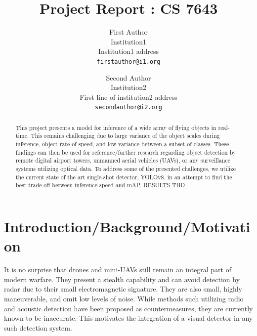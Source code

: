 \documentclass[10pt,twocolumn,letterpaper]{article}
\begin{document}
\title{Project Report : CS 7643}

\author{First Author\\
Institution1\\
Institution1 address\\
{\tt\small firstauthor@i1.org}
\and
Second Author\\
Institution2\\
First line of institution2 address\\
{\tt\small secondauthor@i2.org}
}

\maketitle

\begin{abstract}
   This project presents a model for inference of a wide array of flying objects in real-time. 
   This remains challenging due to large variance of the object scales during inference, object rate of speed, 
   and low variance between a subset of classes. These findings can then be used for reference/further research 
   regarding object detection by remote digital airport towers, unmanned aerial vehicles (UAVs), or any surveillance 
   systems utilizing optical data. To address some of the presented challenges, we utilize the current state of the art 
   single-shot detector, YOLOv8, in an attempt to find the best trade-off between inference speed and mAP. RESULTS TBD
\end{abstract}

\section{Introduction/Background/Motivation}

It is no surprise that drones and mini-UAVs still remain an integral part of modern warfare. They present a stealth capability 
and can avoid detection by radar due to their small electromagnetic signature. They are also small, highly maneuverable, and 
omit low levels of noise. While methods such utilizing radio and acoustic detection have been proposed as countermeasures, they 
are currently known to be inaccurate. This motivates the integration of a visual detector in any such detection system.
\end{document}
